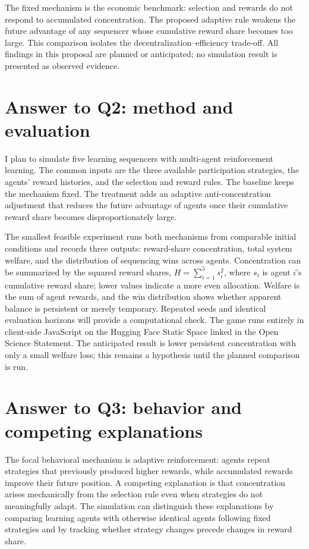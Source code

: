 The fixed mechanism is the economic benchmark: selection and rewards do not respond to accumulated concentration. The proposed adaptive rule weakens the future advantage of any sequencer whose cumulative reward share becomes too large. This comparison isolates the decentralization--efficiency trade-off. All findings in this proposal are planned or anticipated; no simulation result is presented as observed evidence.

\section{Answer to Q2: method and evaluation}
I plan to simulate five learning sequencers with multi-agent reinforcement learning. The common inputs are the three available participation strategies, the agents' reward histories, and the selection and reward rules. The baseline keeps the mechanism fixed. The treatment adds an adaptive anti-concentration adjustment that reduces the future advantage of agents once their cumulative reward share becomes disproportionately large.

The smallest feasible experiment runs both mechanisms from comparable initial conditions and records three outputs: reward-share concentration, total system welfare, and the distribution of sequencing wins across agents. Concentration can be summarized by the squared reward shares, $H=\sum_{i=1}^{5}s_i^2$, where $s_i$ is agent $i$'s cumulative reward share; lower values indicate a more even allocation. Welfare is the sum of agent rewards, and the win distribution shows whether apparent balance is persistent or merely temporary. Repeated seeds and identical evaluation horizons will provide a computational check. The game runs entirely in client-side JavaScript on the Hugging Face Static Space linked in the Open Science Statement. The anticipated result is lower persistent concentration with only a small welfare loss; this remains a hypothesis until the planned comparison is run.

\section{Answer to Q3: behavior and competing explanations}
The focal behavioral mechanism is adaptive reinforcement: agents repeat strategies that previously produced higher rewards, while accumulated rewards improve their future position. A competing explanation is that concentration arises mechanically from the selection rule even when strategies do not meaningfully adapt. The simulation can distinguish these explanations by comparing learning agents with otherwise identical agents following fixed strategies and by tracking whether strategy changes precede changes in reward share.

